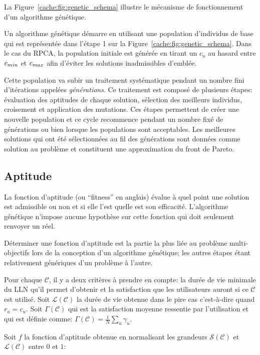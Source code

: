 La Figure~\ref{cache:fig:genetic_schema} illustre le mécanisme de fonctionnement d'un algorithme génétique.

Un algorithme génétique démarre en utilisant une population d'individus de base qui est représentée dans l'étape 1 sur la Figure~\ref{cache:fig:genetic_schema}.
Dans le cas du \ac{RPCA}, la population initiale est générée en tirant un $c_u$ au hasard entre $c_{min}$ et $c_{max}$ afin d'éviter les solutions inadmissibles d'emblée.

Cette population va subir un traitement systématique pendant un nombre fini d'itérations appelées \emph{générations}.
Ce traitement est composé de plusieurs étapes: évaluation des aptitudes de chaque solution, sélection des meilleurs individus, croisement et application des mutations.
Ces étapes permettent de créer une nouvelle population et ce cycle recommence pendant un nombre fixé de générations ou bien lorsque les populations sont acceptables.
Les meilleures solutions qui ont été sélectionnées au fil des générations sont données comme solution au problème et constituent une approximation du front de Pareto.

\subsection{Aptitude}
\label{cache:fitness}

La fonction d'aptitude (ou ``fitness'' en anglais) évalue à quel point une solution est admissible ou non et si elle l'est quelle est son efficacité.
L'algorithme génétique n'impose aucune hypothèse sur cette fonction qui doit seulement renvoyer un réel.

Déterminer une fonction d'aptitude est la partie la plus liée au problème multi-objectifs lors de la conception d'un algorithme génétique; les autres étapes étant relativement génériques d'un problème à l'autre.

Pour chaque $\mathcal{C}$, il y a deux critères à prendre en compte: la durée de vie minimale du \ac{LLN} qu'il permet d'obtenir et la satisfaction que les utilisateurs auront si ce $\mathcal{C}$ est utilisé.
Soit $\mathcal{L}(\mathcal{C})$ la durée de vie obtenue dans le pire cas c'est-à-dire quand $r_u = c_u$.
Soit $\Gamma(\mathcal{C})$ qui est la satisfaction moyenne ressentie par l'utilisation et qui est définie comme: $\Gamma(\mathcal{C}) = \frac{1}{N}\sum_{u} \gamma_u$.

Soit $f$ la fonction d'aptitude obtenue en normalisant les grandeurs $\mathcal{S(C)}$ et $\mathcal{L(C)}$ entre $0$ et $1$:

